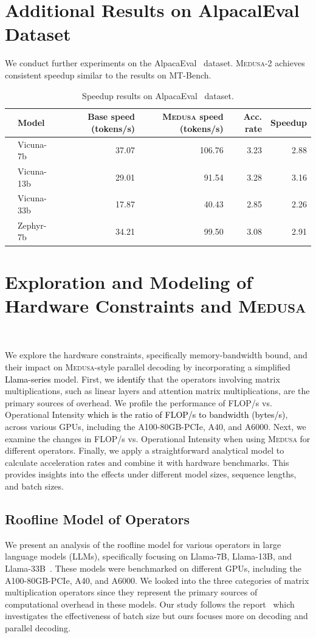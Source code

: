 \documentclass{article}
\theoremstyle{plain}
\theoremstyle{definition}
\theoremstyle{remark}
\newcommand{\ours}
{\textsc{Medusa}\xspace}
\begin{document}
\section{Additional Results on AlpacalEval Dataset}
We conduct further experiments on the AlpacaEval~\citep{alpaca_eval} dataset. \ours-2 achieves consistent speedup similar to the results on MT-Bench.
\begin{table}[h]
    \centering
    \begin{tabular}{llrrrr}
    \toprule
     & Model & Base speed (tokens/s) & \ours speed (tokens/s) & Acc. rate & Speedup \\
    \midrule
     & Vicuna-7b & 37.07 & 106.76 & 3.23 & 2.88 \\
     & Vicuna-13b & 29.01 & 91.54 & 3.28 & 3.16 \\
     & Vicuna-33b & 17.87 & 40.43 & 2.85 & 2.26 \\
     & Zephyr-7b & 34.21 & 99.50 & 3.08 & 2.91 \\
    \bottomrule
    \end{tabular}
    \caption{Speedup results on AlpacaEval~\citep{alpaca_eval} dataset.}
    \label{tab:alpaca_eval_speedup}
\end{table}

\section{Exploration and Modeling of Hardware Constraints and \ours}~\label{sec:roofline}


We explore the hardware constraints, specifically memory-bandwidth bound, and their impact on \ours-style parallel decoding by incorporating a simplified \textcolor{black}{Llama-series} model.
First, we \textcolor{black}{identify} that the operators involving matrix multiplications, such as linear layers and attention matrix multiplications, are the primary sources of overhead. We profile the performance of FLOP/s vs. Operational Intensity \textcolor{black}{which is the ratio of FLOP/s to bandwidth (bytes/s)}, across various GPUs, including the A100-80GB-PCIe, A40, and A6000.
Next, we examine the changes in FLOP/s vs. Operational Intensity when using \ours for different operators.
Finally, we apply a straightforward analytical model to calculate acceleration rates and combine it with hardware benchmarks. This provides insights into the effects under different model sizes, sequence lengths, and batch sizes.

\subsection{Roofline Model of Operators}
We present an analysis of the roofline model for various operators in large language models (LLMs), specifically focusing on Llama-7B, Llama-13B, and Llama-33B~\cite{touvron2023llama}. These models were benchmarked on different GPUs, including the A100-80GB-PCIe, A40, and A6000. We looked into the three categories of matrix multiplication operators since they represent the primary sources of computational overhead in these models. Our study follows the report~\cite{chen2023transformer} which investigates the effectiveness of batch size but ours focuses more on decoding and parallel decoding.
\end{document}

